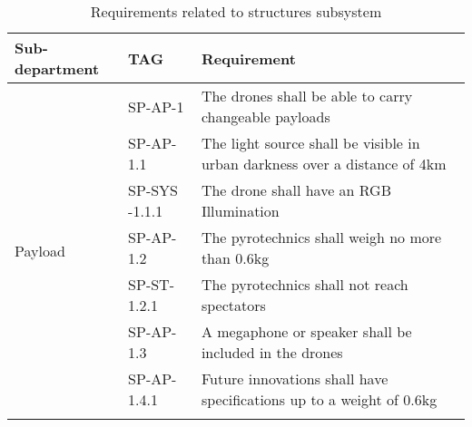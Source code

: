 \begin{table}[H]
\centering
\caption{Requirements related to structures subsystem}
\label{tab:strucrequirements}
\begin{scriptsize}
\begin{tabular}{|p{2cm}|p{2cm}|p{10cm}|}
\hline
\textbf{Sub-department} & \textbf{TAG} & \textbf{Requirement} \\ \hline
\multirow{11}{*}{Payload} & SP-AP-1       & The drones shall be able to carry changeable payloads\\ \cline{2-3}                                                                       
                          & SP-AP-1.1     & The light source shall be visible in urban darkness over a distance of 4km    \\ \cline{2-3}                                               
                          & SP-SYS -1.1.1 & The drone shall have an RGB Illumination   \\ \cline{2-3}  
                          & SP-AP-1.2     & The pyrotechnics shall weigh no more than 0.6kg                                                                              \\ \cline{2-3} 
                          & SP-ST-1.2.1   & The pyrotechnics shall not reach spectators                                                                                  \\\cline{2-3} 
                          & SP-AP-1.3     & A megaphone or speaker shall be included in the drones                                                                       \\\cline{2-3} 
                          
                          & SP-AP-1.4.1   & Future innovations shall have specifications up to a weight of 0.6kg                                                         \\\cline{2-3} 
                          

\end{tabular}
\end{scriptsize}
\end{table}
